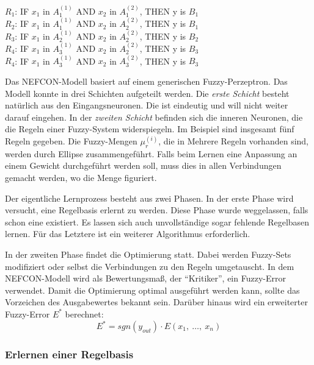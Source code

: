 \begin{center}\label{nef_regelbasis}
	$R_1$: IF $x_1$ in $A_1^{(1)}$ AND $x_2$ in $A_1^{(2)}$, THEN y is $B_1$ \\
	$R_2$: IF $x_1$ in $A_1^{(1)}$ AND $x_2$ in $A_2^{(2)}$, THEN y is $B_1$ \\
	
	$R_3$: IF $x_1$ in $A_2^{(1)}$ AND $x_2$ in $A_2^{(2)}$, THEN y is $B_2$\\
	
	$R_4$: IF $x_1$ in $A_3^{(1)}$ AND $x_2$ in $A_2^{(2)}$, THEN y is $B_3$\\
	
	$R_4$: IF $x_1$ in $A_3^{(1)}$ AND $x_2$ in $A_3^{(2)}$, THEN y is $B_3$
\end{center} 


Das NEFCON-Modell basiert auf einem generischen Fuzzy-Perzeptron. Das Modell konnte in drei Schichten aufgeteilt werden. Die \textit{erste Schicht} besteht natürlich aus den Eingangsneuronen. Die ist eindeutig und will nicht weiter darauf eingehen. In der \textit{zweiten Schicht} befinden sich die inneren Neuronen, die die Regeln einer Fuzzy-System widerspiegeln. Im Beispiel sind insgesamt fünf Regeln gegeben. Die Fuzzy-Mengen $\mu_r^{(i)}$, die in Mehrere Regeln vorhanden sind, werden durch Ellipse zusammengeführt. Falls beim Lernen eine Anpassung an einem Gewicht durchgeführt werden soll, muss dies in allen Verbindungen gemacht werden, wo die Menge figuriert.

Der eigentliche Lernprozess besteht aus zwei Phasen. In der erste Phase wird versucht, eine Regelbasis erlernt zu werden. Diese Phase wurde weggelassen, falls schon eine existiert. Es lassen sich auch unvollständige sogar fehlende Regelbasen lernen. Für das Letztere ist ein weiterer Algorithmus erforderlich.

In der zweiten Phase findet die Optimierung statt. Dabei werden Fuzzy-Sets modifiziert oder selbst die Verbindungen zu den Regeln umgetauscht. In dem NEFCON-Modell wird als Bewertungsmaß, der ``Kritiker'', ein Fuzzy-Error verwendet. Damit die Optimierung optimal ausgeführt werden kann, sollte das Vorzeichen des Ausgabewertes bekannt sein. Darüber hinaus wird ein erweiterter Fuzzy-Error $E^*$ berechnet:
	\begin{equation}\label{EFE}
	E^* = sgn(y_{out})\cdot E(x_1, \ \ldots , \ x_n)
	\end{equation}
\cite{CIKruse:15} \cite{UNIMAG:97}
\subsubsection{Erlernen einer Regelbasis}

